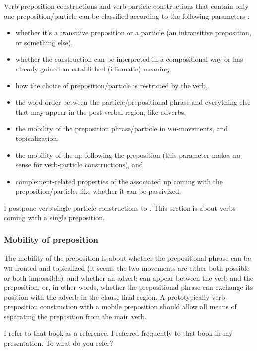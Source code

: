 \documentclass[UTF8, a4paper, oneside, scheme=plain, 12pt]{ctexbook}
\newcommand*{\citepages}[1]{pp.~{#1}}
\newcommand{\category}[1]{\textsc{#1}}
\newcommand{\formcat}[1]{\textsc{#1}}
\begin{document}
Verb-preposition constructions and verb-particle constructions
that contain only one preposition/particle
can be classified according to the following parameters
\citep[\citepages{272-274}]{cgel}:
\begin{itemize}
    \item whether it's a transitive preposition or a particle 
    (an intransitive preposition, or something else),
    \item whether the construction can be interpreted in a compositional way or 
    has already gained an established (idiomatic) meaning,
    \item how the choice of preposition/particle is restricted by the verb,  
    \item the word order between the particle/prepositional phrase and 
    everything else that may appear in the post-verbal region, like adverbs,  
    \item the mobility of the preposition phrase/particle 
    in \formcat{wh}-movements, and topicalization, 
    \item the mobility of the \acs{np} following the preposition 
    (this parameter makes no sense for verb-particle constructions), and 
    \item complement-related properties of the associated \acs{np} coming with the preposition/particle,
    like whether it can be passivized.
\end{itemize}

I postpone verb-single particle constructions to .
This section is about verbs coming with a single preposition.

\subsubsection{Mobility of preposition}\label{sec:vp.valence.verb-prep-obj.mobility}

The mobility of the preposition is about
whether the prepositional phrase can be \category{wh}-fronted and topicalized
(it seems the two movements are either both possible or both impossible),
and whether an adverb can appear 
between the verb and the preposition, 
or, in other words, whether the prepositional phrase can exchange its position with the adverb 
in the clause-final region. 
A prototypically verb-preposition construction with a mobile preposition
should allow all means of separating the preposition from the main verb.

\begin{exe}
    \ex I refer to that book as a reference.
    \ex\label{ex:clause.preposition.after-adjunct.1} I referred frequently to that book in my presentation.
    \ex To what do you refer?
\end{exe}
\end{document}
